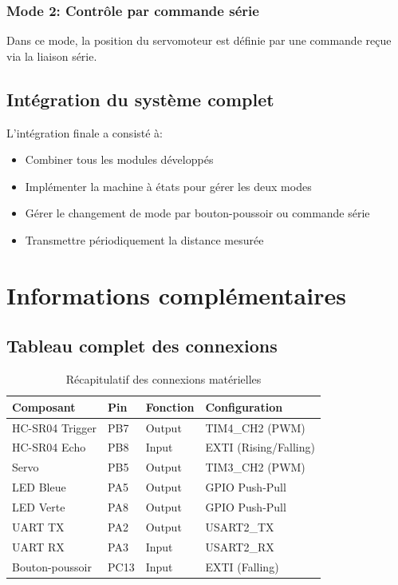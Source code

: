 \documentclass{article}
\begin{document}
\subsubsection{Mode 2: Contrôle par commande série}
Dans ce mode, la position du servomoteur est définie par une commande reçue via la liaison série.

\subsection{Intégration du système complet}
L'intégration finale a consisté à:
\begin{itemize}
    \item Combiner tous les modules développés
    \item Implémenter la machine à états pour gérer les deux modes
    \item Gérer le changement de mode par bouton-poussoir ou commande série
    \item Transmettre périodiquement la distance mesurée
\end{itemize}

\section{Informations complémentaires}

\subsection{Tableau complet des connexions}
\begin{table}[H]
\centering
\begin{tabular}{|l|l|l|l|}
\hline
\textbf{Composant} & \textbf{Pin} & \textbf{Fonction} & \textbf{Configuration} \\
\hline
HC-SR04 Trigger & PB7 & Output & TIM4\_CH2 (PWM) \\
\hline
HC-SR04 Echo & PB8 & Input & EXTI (Rising/Falling) \\
\hline
Servo & PB5 & Output & TIM3\_CH2 (PWM) \\
\hline
LED Bleue & PA5 & Output & GPIO Push-Pull \\
\hline
LED Verte & PA8 & Output & GPIO Push-Pull \\
\hline
UART TX & PA2 & Output & USART2\_TX \\
\hline
UART RX & PA3 & Input & USART2\_RX \\
\hline
Bouton-poussoir & PC13 & Input & EXTI (Falling) \\
\hline
\end{tabular}
\caption{Récapitulatif des connexions matérielles}
\label{tab:connections}
\end{table}
\end{document}
